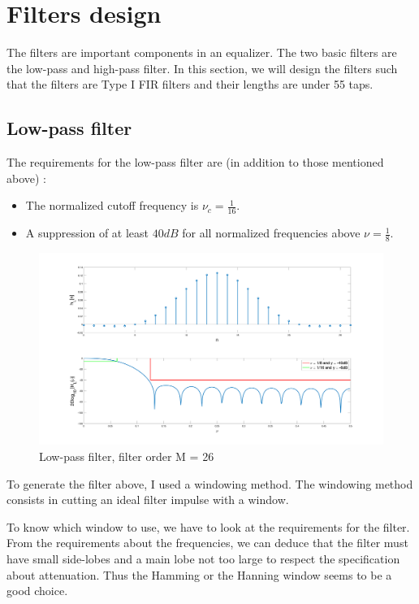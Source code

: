 \documentclass[a4paper]{article}
\begin{document}
\section{Filters design}
\label{sec:filters design}

The filters are important components in an equalizer. The two basic filters are the low-pass and high-pass filter. In this section, we will design the filters such that the filters are Type I FIR filters and their lengths are under 55 taps.

\subsection{Low-pass filter}
The requirements for the low-pass filter are (in addition to those mentioned above) :
\begin{itemize}
	\item The normalized cutoff frequency is $\nu_c = \frac{1}{16}$.
	\item A suppression of at least $40 dB$ for all normalized frequencies above $\nu = \frac{1}{8}$.
\end{itemize}

\begin{figure}[!ht]
\centering
\includegraphics[scale = 0.12]{lowpass}
\caption{Low-pass filter, filter order M = 26}
\label{fig:lowpass}
\end{figure}

To generate the filter above, I used a windowing method. The windowing method consists in cutting an ideal filter impulse with a window.

To know which window to use, we have to look at the requirements for the filter. From the requirements about the frequencies, we can deduce that the filter must have small side-lobes and a main lobe not too large to respect the specification about attenuation. Thus the Hamming or the Hanning window seems to be a good choice.
\end{document}
